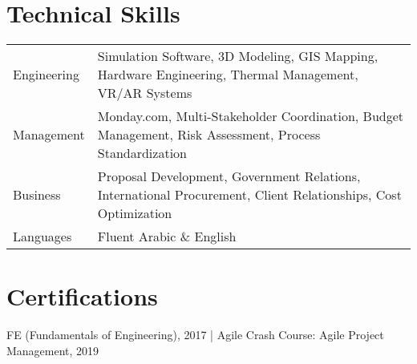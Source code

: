 \documentclass[a4paper,12pt]{article}
\begin{document}
\section{Technical Skills}
\begin{tabularx}{\linewidth}{@{}l X@{}}
Engineering & Simulation Software, 3D Modeling, GIS Mapping, Hardware Engineering, Thermal Management, VR/AR Systems \\
Management & Monday.com, Multi-Stakeholder Coordination, Budget Management, Risk Assessment, Process Standardization \\
Business & Proposal Development, Government Relations, International Procurement, Client Relationships, Cost Optimization \\
Languages & Fluent Arabic \& English \\
\end{tabularx}

\section{Certifications}
FE (Fundamentals of Engineering), 2017 | Agile Crash Course: Agile Project Management, 2019

\vfill
{}
\end{document}
